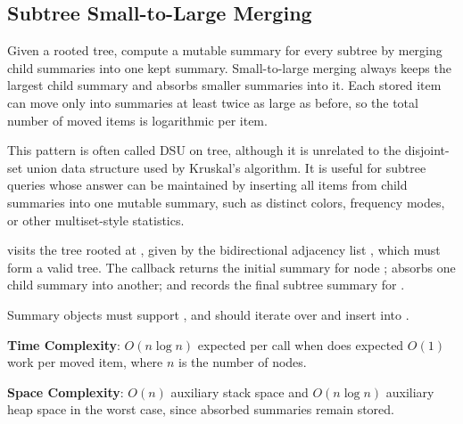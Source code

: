 \subsection{Subtree Small-to-Large Merging}
\label{sec:4.1.5}
Given a rooted tree, compute a mutable summary for every subtree by merging child summaries into one kept summary. Small-to-large merging always keeps the largest child summary and absorbs smaller summaries into it. Each stored item can move only into summaries at least twice as large as before, so the total number of moved items is logarithmic per item.

This pattern is often called DSU on tree, although it is unrelated to the disjoint-set union data structure used by Kruskal's algorithm. It is useful for subtree queries whose answer can be maintained by inserting all items from child summaries into one mutable summary, such as distinct colors, frequency modes, or other multiset-style statistics.

\begin{compactitem}
  \item {} visits the tree rooted at , given by the bidirectional adjacency list , which must form a valid tree. The callback  returns the initial summary for node ;  absorbs one child summary into another; and  records the final subtree summary for .
\end{compactitem}

Summary objects must support , and  should iterate over  and insert into .

\textbf{Time Complexity}: $O(n \log n)$ expected per call when  does expected $O(1)$ work per moved item, where $n$ is the number of nodes.

\textbf{Space Complexity}: $O(n)$ auxiliary stack space and $O(n \log n)$ auxiliary heap space in the worst case, since absorbed summaries remain stored.

